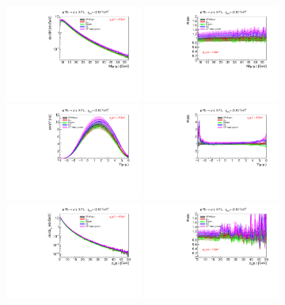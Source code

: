 \begin{figure}[h!]
\includegraphics[width=0.4\textwidth]{figures/Mll_elastic.pdf}
\includegraphics[width=0.4\textwidth]{figures/RatioMll_elastic.pdf}
\includegraphics[width=0.4\textwidth]{figures/Yll_elastic.pdf}
\includegraphics[width=0.4\textwidth]{figures/RatioYll_elastic.pdf}
\includegraphics[width=0.4\textwidth]{figures/pTl_elastic.pdf}
\includegraphics[width=0.4\textwidth]{figures/RatiopTl_elastic.pdf}

\end{figure}
